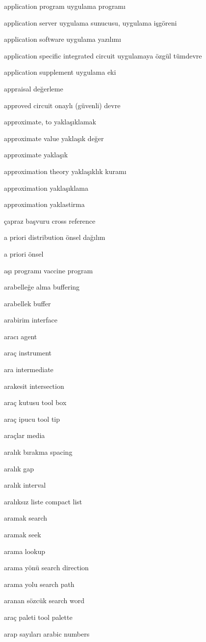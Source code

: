 \documentclass[12pt,fleqn]{article}\usepackage{../../common}
\begin{document}
application program uygulama programı

application server uygulama sunucusu, uygulama işgöreni

application software uygulama yazılımı

application specific integrated circuit uygulamaya özgül tümdevre

application supplement uygulama eki

appraisal değerleme

approved circuit onaylı (güvenli) devre

approximate, to yaklaşıklamak

approximate value yaklaşık değer

approximate yaklaşık

approximation theory yaklaşıklık kuramı

approximation yaklaşıklama

approximation yaklastirma

çapraz başvuru cross reference

a priori distribution önsel dağılım

a priori önsel

aşı programı vaccine program

arabelleğe alma buffering

arabellek buffer

arabirim interface

aracı agent

araç instrument

ara intermediate

arakesit intersection

araç kutusu tool box

araç ipucu tool tip

araçlar media

aralık bırakma spacing

aralık gap

aralık interval

aralıksız liste compact list

aramak search

aramak seek

arama lookup

arama yönü search direction

arama yolu search path

aranan sözcük search word

araç paleti tool palette

arap sayıları arabic numbers
\end{document}

